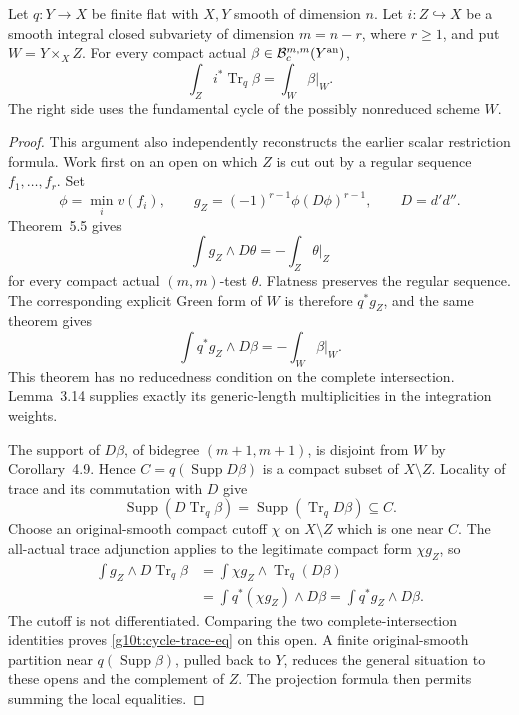 \begin{lemma}
\label{g10t:cycle-trace}
Let $q:Y\to X$ be finite flat with $X,Y$ smooth of dimension
$n$. Let $i:Z\hookrightarrow X$ be a smooth integral closed
subvariety of dimension $m=n-r$, where $r\geq1$, and put
$W=Y\times_X Z$. For every compact actual
$\beta\in\mathcal B_c^{m,m}(Y^{\rm an})$,
\[
                  \int_Z i^*\operatorname{Tr}_q\beta
                    =\int_W \beta|_W.
\tag{G10.T1}\label{g10t:cycle-trace-eq}
\]
The right side uses the fundamental cycle of the possibly
nonreduced scheme $W$.
\end{lemma}

\begin{proof}
This argument also independently reconstructs the earlier scalar
restriction formula. Work first on an open on which $Z$ is cut
out by a regular sequence $f_1,\ldots,f_r$. Set
\[
 \phi=\min_i v(f_i),\qquad
 g_Z=(-1)^{r-1}\phi(D\phi)^{r-1},\qquad D=d'd''.
\]
Theorem~5.5 gives
\[
 \int g_Z\wedge D\theta=-\int_Z\theta|_Z
\]
for every compact actual $(m,m)$-test $\theta$. Flatness preserves
the regular sequence. The corresponding explicit Green form of
$W$ is therefore $q^*g_Z$, and the same theorem gives
\[
                  \int q^*g_Z\wedge D\beta=-\int_W\beta|_W.
\]
This theorem has no reducedness condition on the complete
intersection. Lemma~3.14 supplies exactly its generic-length
multiplicities in the integration weights.

The support of $D\beta$, of bidegree $(m+1,m+1)$, is disjoint
from $W$ by Corollary~4.9. Hence
$C=q(\operatorname{Supp}D\beta)$ is a compact subset of
$X\setminus Z$. Locality of trace and its commutation with $D$
give
\[
 \operatorname{Supp}(D\operatorname{Tr}_q\beta)
       =\operatorname{Supp}(\operatorname{Tr}_qD\beta)\subseteq C.
\]
Choose an original-smooth compact cutoff $\chi$ on $X\setminus Z$
which is one near $C$. The all-actual trace adjunction applies to
the legitimate compact form $\chi g_Z$, so
\[
 \begin{split}
 \int g_Z\wedge D\operatorname{Tr}_q\beta
  &=\int \chi g_Z\wedge\operatorname{Tr}_q(D\beta)\\
  &=\int q^*(\chi g_Z)\wedge D\beta
   =\int q^*g_Z\wedge D\beta.
 \end{split}
\]
The cutoff is not differentiated. Comparing the two
complete-intersection identities proves
\eqref{g10t:cycle-trace-eq} on this open. A finite
original-smooth partition near $q(\operatorname{Supp}\beta)$,
pulled back to $Y$, reduces the general situation to these opens
and the complement of $Z$. The projection formula then permits
summing the local equalities.
\end{proof}

